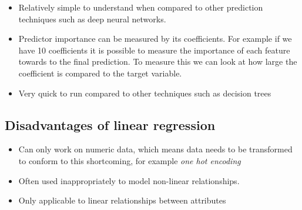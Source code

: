 \begin{itemize}
  \item Relatively simple to understand when compared to other prediction techniques such as deep neural networks.
  \item Predictor importance can be measured by its coefficients. For example if we have 10 coefficients it is possible to measure the importance of each feature towards to the final prediction. To measure this we can look at how large the coefficient is compared to the target variable.
  \item Very quick to run compared to other techniques such as decision trees
\end{itemize}

\subsection{Disadvantages of linear regression}

\begin{itemize}
  \item Can only work on numeric data, which means data needs to be transformed to conform to this shortcoming, for example \textit{one hot encoding}
  \item Often used inappropriately to model non-linear relationships.
  \item Only applicable to linear relationships between attributes
\end{itemize}